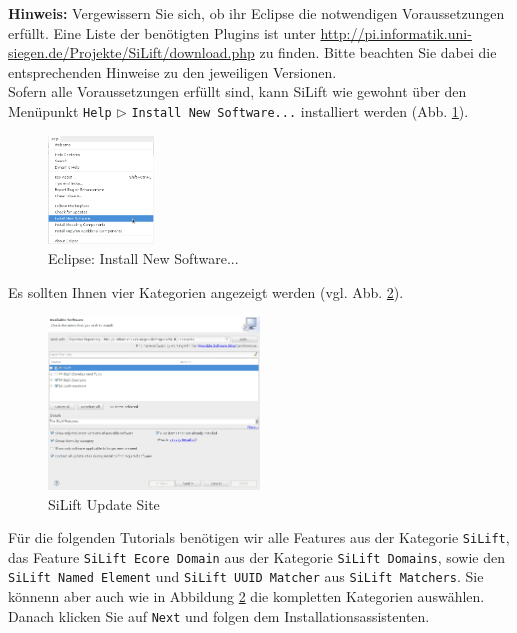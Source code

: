 \documentclass[a4paper]{scrartcl}
\begin{document}
\textbf{Hinweis:} Vergewissern Sie sich, ob ihr Eclipse die notwendigen Voraussetzungen erfüllt. 
Eine Liste der benötigten Plugins ist unter \url{http://pi.informatik.uni-siegen.de/Projekte/SiLift/download.php} zu finden.
Bitte beachten Sie dabei die entsprechenden Hinweise zu den jeweiligen Versionen.\\

Sofern alle Voraussetzungen erfüllt sind, kann SiLift wie gewohnt über den Menüpunkt \texttt{Help} $\triangleright$ \texttt{Install New Software...} installiert werden (Abb. \ref{eclipse_install_new_software}).
\begin{figure}[H]
\centering
\includegraphics[width=0.25\textwidth]{graphics/eclipse-install_new_software.png}
\caption{Eclipse: Install New Software...}
\label{eclipse_install_new_software}
\end{figure}

Es sollten Ihnen vier Kategorien angezeigt werden (vgl. Abb. \ref{silift_update_site}). 

\begin{figure}[H]
\centering
\includegraphics[width=0.5\textwidth]{graphics/eclipse-install_silift.png}
\caption{SiLift Update Site}
\label{silift_update_site}
\end{figure}

Für die folgenden Tutorials benötigen wir alle Features aus der Kategorie \texttt{SiLift},  das Feature \texttt{SiLift Ecore Domain} aus der Kategorie \texttt{SiLift Domains}, sowie den \texttt{SiLift Named Element} und \texttt{SiLift UUID Matcher} aus \texttt{SiLift Matchers}. Sie könnenn aber auch wie in Abbildung \ref{silift_update_site} die kompletten Kategorien auswählen. Danach klicken Sie auf \texttt{Next} und folgen dem Installationsassistenten.\\
\end{document}
